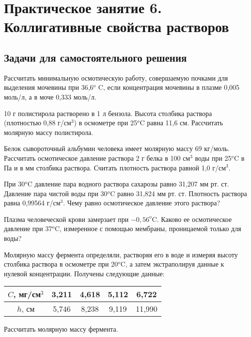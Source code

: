 \chapter{ Практическое занятие 6. Коллигативные свойства растворов}
\section{Задачи для самостоятельного решения}
\begin{Task}
Рассчитать минимальную осмотическую работу, совершаемую почками для выделения мочевины при 36,6$^{o}$ C, если концентрация мочевины в плазме 0,005 моль/л, а в моче 0,333 моль/л.
\end{Task}
\begin{Task}
10 г полистирола растворено в 1 л бензола. Высота столбика раствора (плотностью 0,88 г/см$^{3}$) в осмометре при 25$^{o}$C равна 11,6 см. Рассчитать молярную массу полистирола.
\end{Task}
\begin{Task}
Белок сывороточный альбумин человека имеет молярную массу 69 кг/моль. Рассчитать осмотическое давление раствора 2 г белка в 100 см$^{3}$ воды при 25$^{o}$C в Па и в мм столбика раствора. Считать плотность раствора равной 1,0 г/см$^{3}$.
\end{Task}
\begin{Task}
При 30$^{o}$C давление пара водного раствора сахарозы равно 31,207 мм рт. ст. Давление пара чистой воды при 30$^{o}$C равно 31,824 мм рт. ст. Плотность раствора равна 0,99564 г/см$^{3}$. Чему равно осмотическое давление этого раствора?
\end{Task}
\begin{Task}
Плазма человеческой крови замерзает при $-0,56^{o}$C. Каково ее осмотическое давление при 37$^{o}$C, измеренное с помощью мембраны, проницаемой только для воды?
\end{Task}
\begin{Task}
Молярную массу фермента определяли, растворяя его в воде и измеряя высоту столбика раствора в осмометре при 20$^{o}$C, а затем экстраполируя данные к нулевой концентрации. Получены следующие данные:\\
\begin{tabular}{|c|c|c|c|c|}
\hline 
$C$, мг/см$^{3}$ & 3,211 & 4,618 & 5,112 & 6,722\\
\hline
$h$, см & 5,746 & 8,238 & 9,119 & 11,990\\
\hline
\end{tabular} 

Рассчитать молярную массу фермента.
\end{Task}
